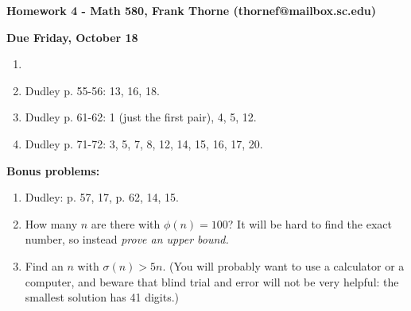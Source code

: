 \documentclass[12pt]{article}
\begin{document}
\setlength{\topmargin}{-2mm}





\begin{center}{\bf Homework 4 - Math 580, Frank Thorne (thornef@mailbox.sc.edu)}
\end{center}
\begin{center}
{\bf Due Friday, October 18}
\end{center}
\begin{enumerate}[(1)]
\item 
\item
Dudley p. 55-56: 13, 16, 18.
\item
Dudley p. 61-62: 1 (just the first pair), 4, 5, 12.
\item
Dudley p. 71-72: 3, 5, 7, 8, 12, 14, 15, 16, 17, 20.
\end{enumerate}

{\bf Bonus problems:}
\begin{enumerate}[(1)]
\item
Dudley: p. 57, 17, p. 62, 14, 15.
\item
How many $n$ are there with $\phi(n) = 100$? It will be hard to find the exact number, so instead
{\itshape prove an upper bound.}
\item
Find an $n$ with $\sigma(n) > 5n$. (You will probably want to use a calculator or a computer, and beware that
blind trial and error will not be very helpful: the smallest solution has 41 digits.)
\end{enumerate}
\end{document}
